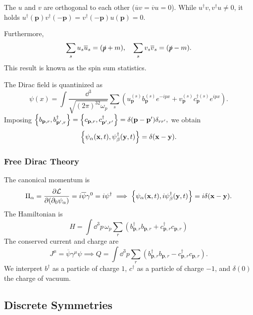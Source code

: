 \documentclass{article}
\begin{document}
The $u$ and $v$ are orthogonal to each other ($\overline uv=\overline vu=0$). While $u^\dag v,v^\dag u\ne 0$, it holds $u^\dag(\mathbf p)v^\dag(-\mathbf p)=v^\dag(-\mathbf p)u(\mathbf p)=0$.

Furthermore, 
\begin{equation}
    \sum_su_s\overline u_s=(\slashed p+m),\quad\sum_sv_s\overline v_s=(\slashed p-m).
\end{equation}
This result is known as the spin sum statistics.

The Dirac field is quantinized as 
\begin{equation}
    \psi(x)=\int\frac{\dd^3}{\sqrt{(2\pi)^32\omega_p}}\sum_s\left(u^{(s)}_{\mathbf p}b^{(s)}_{\mathbf p}e^{-ipx}+v^{(s)}_{\mathbf p}c^{\dag(s)}_{\mathbf p}e^{ipx}\right).
\end{equation}
Imposing $\acomm{b_{\mathbf p,r}}{b^\dag_{\mathbf p',r}}=\acomm{c_{\mathbf p,r}}{c^\dag_{\mathbf p',r'}}=\delta(\mathbf p-\mathbf p')\delta_{rr'},$ we obtain
\begin{equation}
    \acomm{\psi_\alpha(\mathbf x,t)}{\psi^\dag_\beta(\mathbf y,t)}=\delta(\mathbf x-\mathbf y).
\end{equation}

\subsubsection{Free Dirac Theory}

The canonical momentum is 
\begin{equation}
    \Pi_\alpha=\pde{\mathcal L}{(\partial_0\psi_\alpha)}=i\overline\psi\gamma^0=i\psi^\dag\implies\acomm{\psi_\alpha(\mathbf x,t)}{i\psi^\dag_\beta(\mathbf y,t)}=i\delta(\mathbf x-\mathbf y).
\end{equation}
The Hamiltonian is 
\begin{equation}
    H=\int\dd^3p\,\omega_p\sum_r\left(b^\dag_{\mathbf p,r}b_{\mathbf p,r}+c^\dag_{\mathbf p,r}c_{\mathbf p,r}\right)
\end{equation}
The conserved current and charge are 
\begin{equation}
    J^\mu=\overline\psi\gamma^\mu\psi\implies Q=\int\dd^3p\sum_r\left(b^\dag_{\mathbf p,r}b_{\mathbf p,r}-c^\dag_{\mathbf p,r}c_{\mathbf p,r}\right).
\end{equation}
We interpret $b^\dag$ as a particle of charge $1$, $c^\dag$ as a particle of charge $-1$, and $\delta(0)$ the charge of vacuum. 

\subsection{Discrete Symmetries}
\end{document}
